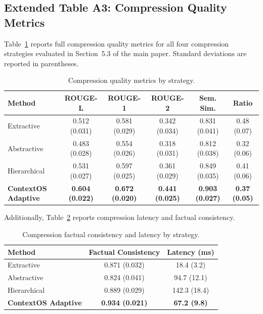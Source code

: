 \subsection{Extended Table A3: Compression Quality Metrics}

Table~\ref{tab:app_compression_quality} reports full compression quality
metrics for all four compression strategies evaluated in Section~5.3 of the
main paper.  Standard deviations are reported in parentheses.

\begin{table}[h!]
\centering
\caption{Compression quality metrics by strategy.}
\label{tab:app_compression_quality}
\begin{tabular}{@{}lccccc@{}}
\toprule
\textbf{Method} & \textbf{ROUGE-L} & \textbf{ROUGE-1} & \textbf{ROUGE-2} & \textbf{Sem. Sim.} & \textbf{Ratio} \\
\midrule
Extractive        & 0.512 (0.031) & 0.581 (0.029) & 0.342 (0.034) & 0.831 (0.041) & 0.48 (0.07) \\
Abstractive       & 0.483 (0.028) & 0.554 (0.026) & 0.318 (0.031) & 0.812 (0.038) & 0.32 (0.06) \\
Hierarchical      & 0.531 (0.027) & 0.597 (0.025) & 0.361 (0.029) & 0.849 (0.035) & 0.41 (0.06) \\
\textbf{ContextOS Adaptive} & \textbf{0.604 (0.022)} & \textbf{0.672 (0.020)} & \textbf{0.441 (0.025)} & \textbf{0.903 (0.027)} & \textbf{0.37 (0.05)} \\
\bottomrule
\end{tabular}
\end{table}

Additionally, Table~\ref{tab:app_compression_latency} reports compression
latency and factual consistency.

\begin{table}[h!]
\centering
\caption{Compression factual consistency and latency by strategy.}
\label{tab:app_compression_latency}
\begin{tabular}{@{}lcc@{}}
\toprule
\textbf{Method} & \textbf{Factual Consistency} & \textbf{Latency (ms)} \\
\midrule
Extractive        & 0.871 (0.032) &  18.4 (3.2) \\
Abstractive       & 0.824 (0.041) &  94.7 (12.1) \\
Hierarchical      & 0.889 (0.029) & 142.3 (18.4) \\
\textbf{ContextOS Adaptive} & \textbf{0.934 (0.021)} &  \textbf{67.2 (9.8)} \\
\bottomrule
\end{tabular}
\end{table}

